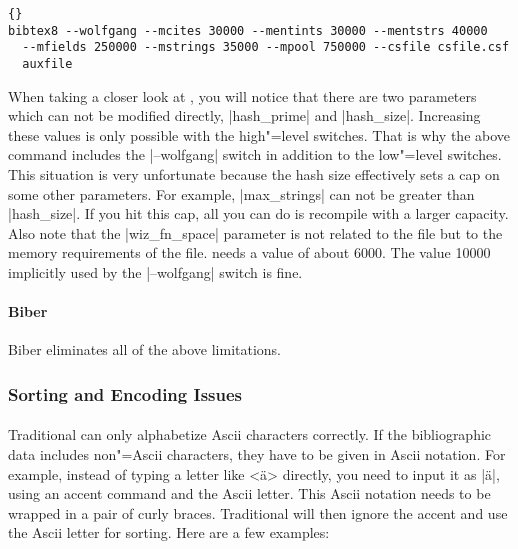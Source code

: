 \documentclass{ltxdockit}[2011/03/25]
\newcommand*{\biber}{Biber\xspace}
\begin{document}
\begin{lstlisting}[style=plain]{}
bibtex8 --wolfgang --mcites 30000 --mentints 30000 --mentstrs 40000
  --mfields 250000 --mstrings 35000 --mpool 750000 --csfile csfile.csf
  auxfile
\end{lstlisting}
%
When taking a closer look at , you will notice that there are two parameters which can not be modified directly, |hash_prime| and |hash_size|. Increasing these values is only possible with the high"=level switches. That is why the above command includes the |--wolfgang| switch in addition to the low"=level switches. This situation is very unfortunate because the hash size effectively sets a cap on some other parameters. For example, |max_strings| can not be greater than |hash_size|. If you hit this cap, all you can do is recompile  with a larger capacity. Also note that the |wiz_fn_space| parameter is not related to the  file but to the memory requirements of the  file.  needs a value of about 6000. The value 10000 implicitly used by the |--wolfgang| switch is fine.

\paragraph{\biber}
\biber eliminates all of the above limitations.

\subsubsection{Sorting and Encoding Issues}
\label{bib:cav:enc}

\paragraph{\bibtex}
\label{bib:cav:enc:btx}
Traditional \bibtex can only alphabetize Ascii characters correctly. If the bibliographic data includes non"=Ascii characters, they have to be given in Ascii notation. For example, instead of typing a letter like <ä> directly, you need to input it as |\"a|, using an accent command and the Ascii letter. This Ascii notation needs to be wrapped in a pair of curly braces. Traditional \bibtex will then ignore the accent and use the Ascii letter for sorting. Here are a few examples:
\end{document}
